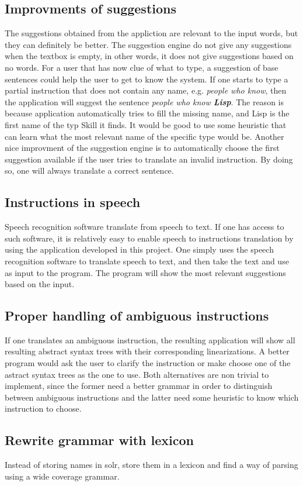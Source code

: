 \subsection*{Improvments of suggestions}
The suggestions obtained from the appliction are relevant to the input words, but they can definitely be better. The suggestion engine do not give any suggestions when the textbox is empty, in other words, it does not give suggestions based on no words. For a user that has now clue of what to type, a suggestion of base sentences could help the user to get to know the system.
\newline
\newline
If one starts to type a partial instruction that does not contain any name, e.g. \emph{people who know}, then the application will suggest the sentence \emph{people who know \textbf{Lisp}}. The reason is because application automatically tries to fill the missing name, and Lisp is the first name of the typ Skill it finds. It would be good to use some heuristic that can learn what the most relevant name of the specific type would be.
\newline
\newline
Another nice improvment of the suggestion engine is to automatically choose the first suggestion available if the user tries to translate an invalid instruction. By doing so, one will always translate a correct sentence.

\subsection*{Instructions in speech}
Speech recognition software translate from speech to text. If one has access to such software, it is relatively easy to enable speech to instructions translation by using the application developed in this project. One simply uses the speech recognition software to translate speech to text, and then take the text and use as input to the program. The program will show the most relevant suggestions based on the input.

\subsection*{Proper handling of ambiguous instructions}
If one translates an ambiguous instruction, the resulting application will show all resulting abstract syntax trees with their corresponding linearizations. A better program would ask the user to clarify the instruction or make choose one of the astract syntax trees as the one to use. Both alternatives are non trivial to implement, since the former need a better grammar in order to distinguish between ambiguous instructions and the latter need some heuristic to know which instruction to choose.

\subsection*{Rewrite grammar with lexicon}
Instead of storing names in solr, store them in a lexicon and find a way of parsing using a wide coverage grammar.